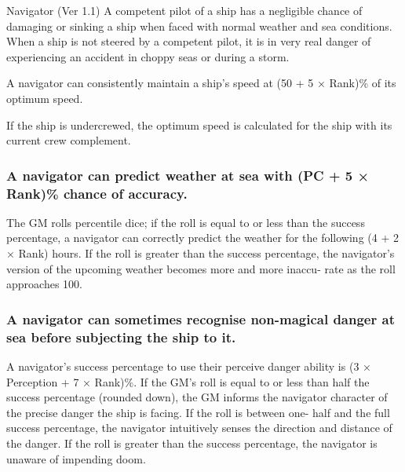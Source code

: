 \begin{Chapter}{Navigator (Ver 1.1)}
A competent pilot of a ship has a negligible chance of damaging or
sinking a ship when faced with normal weather and sea conditions.
When a ship is not steered by a competent pilot, it is in very real
danger of experiencing an accident in choppy seas or during a storm.

A navigator can consistently maintain a ship’s speed at (50 + 5 ×
Rank)\% of its optimum speed.

If the ship is undercrewed, the optimum speed is calculated for the
ship with its current crew complement.

\subsubsection{A navigator can predict weather at sea with (PC + 5 × Rank)\% chance of accuracy.}

The GM rolls percentile dice; if the roll is equal to or less than the
success percentage, a navigator can correctly predict the weather for
the following (4 + 2 × Rank) hours. If the roll is greater than the
success percentage, the navigator’s version of the upcoming weather
becomes more and more inaccu- rate as the roll approaches 100.

\subsubsection{A navigator can sometimes recognise non-magical danger at sea before
subjecting the ship to it.}

A navigator’s success percentage to use their perceive danger ability
is (3 × Perception + 7 × Rank)\%.  If the GM’s roll is equal to or
less than half the success percentage (rounded down), the GM informs
the navigator character of the precise danger the ship is facing. If
the roll is between one- half and the full success percentage, the
navigator intuitively senses the direction and distance of the danger.
If the roll is greater than the success percentage, the navigator is
unaware of impending doom.

\end{Chapter}
